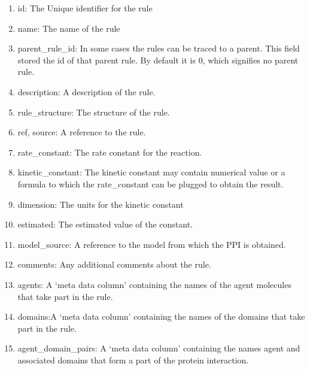 \documentclass[msc,deptreport,ai]{infthesis}      %
\begin{document}
\begin{enumerate}
\begin{enumerate}
	\item id: The Unique identifier for the rule
	\item name: The name of the rule
	\item parent\_rule\_id: In some cases the rules can be traced to a parent. This field stored the id of that parent rule. By default it is 0, which signifies no parent rule.
	\item description: A description of the rule.
	\item rule\_structure: The structure of the rule. 
	\item ref, source: A reference to the rule.
	\item rate\_constant: The rate constant for the reaction.
	\item kinetic\_constant: The kinetic constant may contain numerical value or a formula to which the rate\_constant can be plugged to obtain the result.
	\item dimension: The units for the kinetic constant
	\item estimated: The estimated value of the constant.
	\item model\_source: A reference to the model from which the PPI is obtained.
	\item comments: Any additional comments about the rule.
	\item agents: A `meta data column' containing the names of the agent molecules that take part in the rule.
	\item domains:A `meta data column' containing the names of the domains that take part in the rule.
	\item agent\_domain\_pairs:	A `meta data column' containing the names agent and associated domains that form a part of the protein interaction.
	\end{enumerate}
\end{enumerate}
\end{document}
